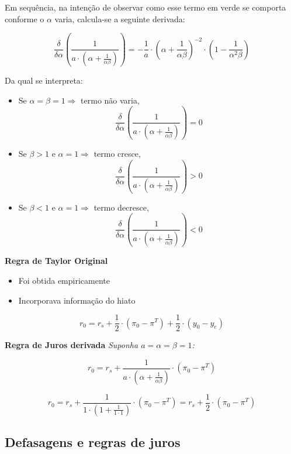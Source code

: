 \documentclass[a4paper,12pt]{article}[abntex2]
\begin{document}
Em sequência, na intenção de observar como esse termo em verde se comporta conforme o \( \alpha \) varia, calcula-se a seguinte derivada:

\[
\frac{\delta}{\delta \alpha} \left( \frac{1}{a \cdot \left( \alpha + \frac{1}{\alpha \beta} \right)} \right)
= -\frac{1}{a} \cdot \left( \alpha + \frac{1}{\alpha \beta} \right)^{-2} \cdot \left( 1 - \frac{1}{\alpha^2 \beta} \right)
\]

Da qual se interpreta:

\begin{itemize}
    \item Se \( \alpha = \beta = 1 \Rightarrow \) termo não varia,
    \[
    \frac{\delta}{\delta \alpha} \left( \frac{1}{a \cdot \left( \alpha + \frac{1}{\alpha \beta} \right)} \right) = 0
    \]

    \item Se \( \beta > 1 \) e \( \alpha = 1 \Rightarrow \) termo cresce,
    \[
    \frac{\delta}{\delta \alpha} \left( \frac{1}{a \cdot \left( \alpha + \frac{1}{\alpha \beta} \right)} \right) > 0
    \]

    \item Se \( \beta < 1 \) e \( \alpha = 1 \Rightarrow \) termo decresce,
    \[
    \frac{\delta}{\delta \alpha} \left( \frac{1}{a \cdot \left( \alpha + \frac{1}{\alpha \beta} \right)} \right) < 0
    \]
\end{itemize}

\textbf{Regra de Taylor Original}
\begin{itemize}
    \item Foi obtida empiricamente
    \item Incorporava informação do hiato
\end{itemize}

\[
r_0 = r_s + \frac{1}{2} \cdot (\pi_0 - \pi^T) + \frac{1}{2} \cdot (y_0 - y_e)
\]

\textbf{Regra de Juros derivada} \quad \textit{Suponha \( a = \alpha = \beta = 1 \):}

\[
r_0 = r_s + \frac{1}{a \cdot \left( \alpha + \frac{1}{\alpha \beta} \right)} \cdot (\pi_0 - \pi^T)
\]

\[
r_0 = r_s + \frac{1}{1 \cdot \left( 1 + \frac{1}{1 \cdot 1} \right)} \cdot (\pi_0 - \pi^T)
= r_s + \frac{1}{2} \cdot (\pi_0 - \pi^T)
\]

\subsection{\textbf{Defasagens e regras de juros}}
\end{document}
